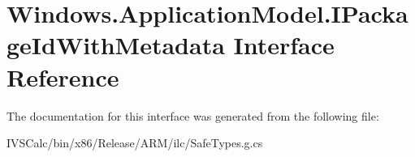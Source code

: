 \hypertarget{interface_windows_1_1_application_model_1_1_i_package_id_with_metadata}{}\section{Windows.\+Application\+Model.\+I\+Package\+Id\+With\+Metadata Interface Reference}
\label{interface_windows_1_1_application_model_1_1_i_package_id_with_metadata}


The documentation for this interface was generated from the following file\+:\begin{DoxyCompactItemize}
\item 
I\+V\+S\+Calc/bin/x86/\+Release/\+A\+R\+M/ilc/Safe\+Types.\+g.\+cs\end{DoxyCompactItemize}
